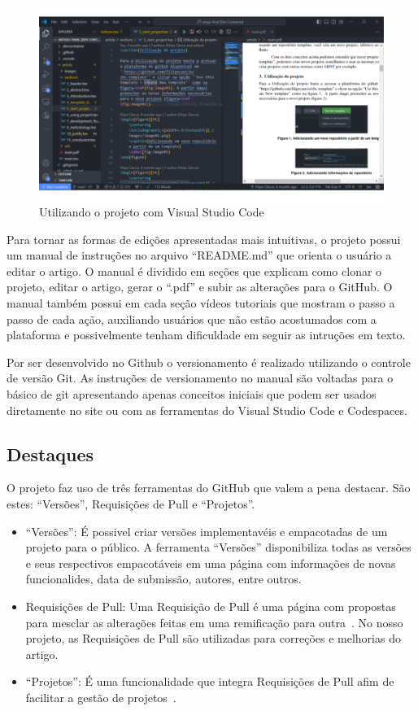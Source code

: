 \begin{itemize}
	\begin{figure}[H]
		\centering
		\includegraphics[width=.6\textwidth]{./images/fig01.png}
		\caption{Utilizando o projeto com Visual Studio Code}
		\label{fig:fig03}
	\end{figure}
\end{itemize}

Para tornar as formas de edições apresentadas mais intuitivas, o projeto possui um manual de instruções no arquivo ``README.md'' que orienta o usuário a editar o artigo. O manual é dividido em seções que explicam como clonar o projeto, editar o artigo, gerar o ``.pdf'' e subir as alterações para o GitHub. O manual também possui em cada seção vídeos tutoriais que mostram o passo a passo de cada ação, auxiliando usuários que não estão acostumados com a plataforma e possivelmente tenham dificuldade em seguir as intruções em texto.

Por ser desenvolvido no Github o versionamento é realizado utilizando o controle de versão Git. As instruções de versionamento no manual são voltadas para o básico de git apresentando apenas conceitos iniciais que podem ser usados diretamente no site ou com as ferramentas do Visual Studio Code e Codespaces.

\subsection{Destaques}
O projeto faz uso de três ferramentas do GitHub que valem a pena destacar. São estes: ``Versões'', Requisições de Pull e ``Projetos''.
\begin{itemize}
	\item ``Versões'': É possivel criar versões implementavéis e empacotadas de um projeto para o público. A ferramenta ``Versões'' disponibiliza todas as versões e seus respectivos empacotáveis em uma página com informações de novas funcionalides, data de submissão, autores, entre outros.~\cite{github:03}
	\item Requisições de Pull: Uma Requisição de Pull é uma página com propostas para mesclar as alterações feitas em uma remificação para outra~\cite{github:04}. No nosso projeto, as Requisições de Pull são utilizadas para correções e melhorias do artigo.
	\item ``Projetos'': É uma funcionalidade que integra Requisições de Pull afim de facilitar a gestão de projetos~\cite{github:05}.
\end{itemize}


